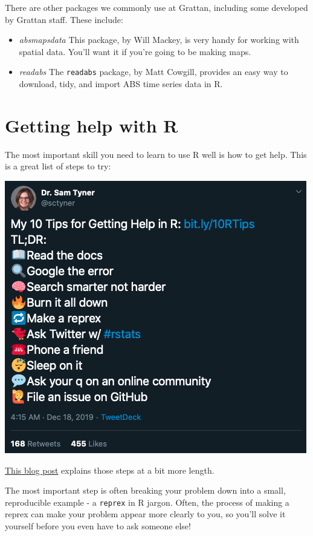 \documentclass[]{book}
\begin{document}
There are other packages we commonly use at Grattan, including some developed by Grattan staff. These include:

\begin{itemize}
\item
  \emph{absmapsdata} This package, by Will Mackey, is very handy for working with spatial data. You'll want it if you're going to be making maps.
\item
  \emph{readabs} The \texttt{readabs} package, by Matt Cowgill, provides an easy way to download, tidy, and import ABS time series data in R.
\end{itemize}

\hypertarget{getting-help-with-r}{%
\chapter{Getting help with R}\label{getting-help-with-r}}

The most important skill you need to learn to use R well is how to get help. This is a great list of steps to try:

\href{https://mobile.twitter.com/sctyner/status/1206986161434058752}{\includegraphics{atlas/getting_help_tweet.png}}

\href{https://sctyner.github.io/rhelp.html}{This blog post} explains those steps at a bit more length.

The most important step is often breaking your problem down into a small, reproducible example - a \texttt{reprex} in R jargon. Often, the process of making a reprex can make your problem appear more clearly to you, so you'll solve it yourself before you even have to ask someone else!
\end{document}

